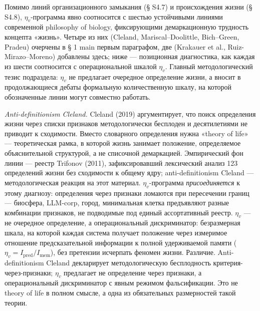 \documentclass[pdflatex,sn-mathphys-ay]{sn-jnl}
\begin{document}
Помимо линий организационного замыкания (§ S4.7) и происхождения жизни (§ S4.8), \(\eta_v\)-программа явно соотносится с шестью устойчивыми линиями современной philosophy of biology, фиксирующими демаркационную трудность концепта «жизнь». Четыре из них (Cleland, Mariscal--Doolittle, Bich--Green, Pradeu) очерчены в § 1 main первым параграфом, две (Krakauer et al., Ruiz-Mirazo--Moreno) добавлены здесь; ниже --- позиционная диагностика, как каждая из шести соотносится с операциональной шкалой \(\eta_v\). Главный методологический тезис подраздела: \(\eta_v\) не предлагает очередное определение жизни, а вносит в продолжающиеся дебаты формальную количественную шкалу, на которой обозначенные линии могут совместно работать.

\emph{Anti-definitionism Cleland.} Cleland (2019) аргументирует, что поиск определения жизни через списки признаков методологически бесплоден и десятилетиями не приводит к сходимости. Вместо словарного определения нужна «theory of life» --- теоретическая рамка, в которой жизнь занимает положение, определяемое объяснительной структурой, а не списочной демаркацией. Эмпирический фон линии --- реестр Trifonov (2011), зафиксировавший лексический анализ 123 определений жизни без сходимости к общему ядру; anti-definitionism Cleland --- методологическая реакция на этот материал. \(\eta_v\)-программа \emph{присоединяется} к этому диагнозу: определения через признаки ломаются при пересечении границ --- биосфера, LLM-corp, город, минимальная клетка предъявляют разные комбинации признаков, не подводимые под единый ассортативный реестр. \(\eta_v\) --- не очередное определение, а операциональный дискриминатор: безразмерная шкала, на которой каждая система получает положение через измеримое отношение предсказательной информации к полной удерживаемой памяти (\(\eta_v = I_{\text{pred}}/I_{\text{mem}}\)), без претензии исчерпать феномен жизни. Различие. Anti-definitionism Cleland декларирует методологическую бесплодность критерия-через-признаки; \(\eta_v\) предлагает не определение через признаки, а операциональный дискриминатор с явным режимом фальсификации. Это не theory of life в полном смысле, а одна из обязательных размерностей такой теории.
\end{document}
